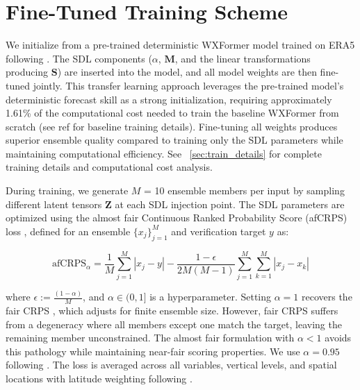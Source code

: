 \documentclass{agujournal2019}
\begin{document}
\section{Fine-Tuned Training Scheme}


We initialize from a pre-trained deterministic WXFormer model trained on ERA5 following \cite{schreck2025}. The SDL components ($\alpha$, $\mathbf{M}$, and the linear transformations producing $\mathbf{S}$) are inserted into the model, and all model weights are then fine-tuned jointly. This transfer learning approach leverages the pre-trained model's deterministic forecast skill as a strong initialization, requiring approximately 1.61\% of the computational cost needed to train the baseline WXFormer from scratch (see ref \cite{schreck2025} for baseline training details). Fine-tuning all weights produces superior ensemble quality compared to training only the SDL parameters while maintaining computational efficiency. See ~\ref{sec:train_details} for complete training details and computational cost analysis.

During training, we generate $M$ = 10 ensemble members per input by sampling different latent tensors $\mathbf{Z}$ at each SDL injection point. The SDL parameters are optimized using the almost fair Continuous Ranked Probability Score (afCRPS) loss \cite{lang2024aifs}, defined for an ensemble $\{x_j\}_{j=1}^M$ and verification target $y$ as:

\begin{equation}
\text{afCRPS}_\alpha = \frac{1}{M}\sum_{j=1}^M |x_j - y| - \frac{1-\epsilon}{2M(M-1)}\sum_{j=1}^M\sum_{k=1}^M |x_j - x_k|
\label{eq:afcrps}
\end{equation}

where $\epsilon := \frac{(1-\alpha)}{M}$, and $\alpha \in (0,1]$ is a hyperparameter. Setting $\alpha = 1$ recovers the fair CRPS \cite{ferro2013fair}, which adjusts for finite ensemble size. However, fair CRPS suffers from a degeneracy where all members except one match the target, leaving the remaining member unconstrained. The almost fair formulation with $\alpha < 1$ avoids this pathology while maintaining near-fair scoring properties. We use $\alpha = 0.95$ following \cite{lang2024aifs}. The loss is averaged across all variables, vertical levels, and spatial locations with latitude weighting following \cite{schreck2025}.
\end{document}
